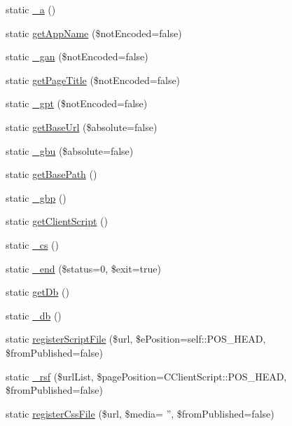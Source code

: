 \begin{DoxyCompactItemize}
\item 
static \hyperlink{classCPSHelperBase_ae09ab8187b8a6c8c52edbf143ab29178}{\_\-a} ()
\item 
static \hyperlink{classCPSHelperBase_acccbaa90b1a64a266dccb84beddc0072}{getAppName} (\$notEncoded=false)
\item 
static \hyperlink{classCPSHelperBase_a1d56b31ce9c7910652552fbbff54e753}{\_\-gan} (\$notEncoded=false)
\item 
static \hyperlink{classCPSHelperBase_ac40cca24aed8a5bee1923c9246dfb524}{getPageTitle} (\$notEncoded=false)
\item 
static \hyperlink{classCPSHelperBase_af074b8b3a4af1495117d744265f41ebb}{\_\-gpt} (\$notEncoded=false)
\item 
static \hyperlink{classCPSHelperBase_a708f96ed3ee0883697ce4914fdddfba9}{getBaseUrl} (\$absolute=false)
\item 
static \hyperlink{classCPSHelperBase_a7c4e9be274589248e2464de14fad190e}{\_\-gbu} (\$absolute=false)
\item 
static \hyperlink{classCPSHelperBase_a3bb459a6846521b0bd79787a1087ebf1}{getBasePath} ()
\item 
static \hyperlink{classCPSHelperBase_affd02de4bb532b2fb524f94f4e5ea40a}{\_\-gbp} ()
\item 
static \hyperlink{classCPSHelperBase_a49d793208ca4ce56f72b743ef86dd162}{getClientScript} ()
\item 
static \hyperlink{classCPSHelperBase_af1b9a8d121721a5a4454e0fb067f7cad}{\_\-cs} ()
\item 
static \hyperlink{classCPSHelperBase_a24e233f4e0820febba74cd15dd57b6d8}{\_\-end} (\$status=0, \$exit=true)
\item 
static \hyperlink{classCPSHelperBase_a994ac6292d92ce6c172ee2f655b91ae4}{getDb} ()
\item 
static \hyperlink{classCPSHelperBase_a0debfa12a6b7b0b27d739a92f7d9ac58}{\_\-db} ()
\item 
static \hyperlink{classCPSHelperBase_a6fd77833c97fcb3d12378783f60c2942}{registerScriptFile} (\$url, \$ePosition=self::POS\_\-HEAD, \$fromPublished=false)
\item 
static \hyperlink{classCPSHelperBase_ae5089c4caea1197b2462a18eda83ca8c}{\_\-rsf} (\$urlList, \$pagePosition=CClientScript::POS\_\-HEAD, \$fromPublished=false)
\item 
static \hyperlink{classCPSHelperBase_af06aa8413e78124ffe297435efed445a}{registerCssFile} (\$url, \$media= '', \$fromPublished=false)
\item 

\end{DoxyCompactItemize}

